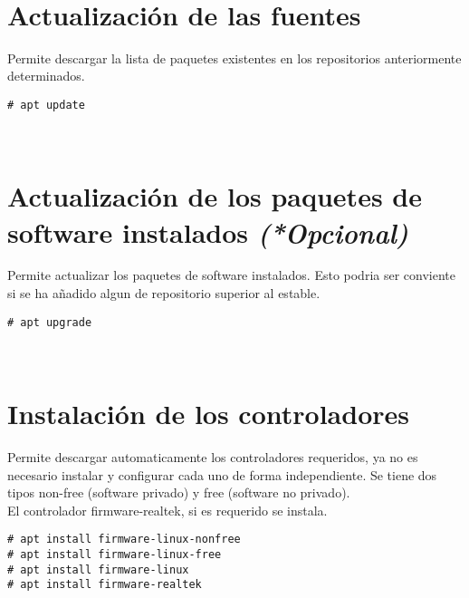 \\[1em]

\section{Actualización de las fuentes}
Permite descargar la lista de paquetes existentes en los repositorios anteriormente determinados.
\begin{verbatim}
# apt update
\end{verbatim}
\\[1em]

\section{Actualización de los paquetes de software instalados \emph{(*Opcional)}}
Permite actualizar los paquetes de software instalados. Esto podria ser conviente si se ha añadido algun de repositorio superior al estable.
\begin{verbatim}
# apt upgrade
\end{verbatim}
\\[1em]

\section{Instalación de los controladores}
Permite descargar automaticamente los controladores requeridos, ya no es necesario instalar y configurar cada uno de forma independiente. Se tiene dos tipos non-free (software privado) y free (software no privado).\\
El controlador firmware-realtek, si es requerido se instala.
\begin{verbatim}
# apt install firmware-linux-nonfree
# apt install firmware-linux-free
# apt install firmware-linux
# apt install firmware-realtek
\end{verbatim}
\\[1em]


